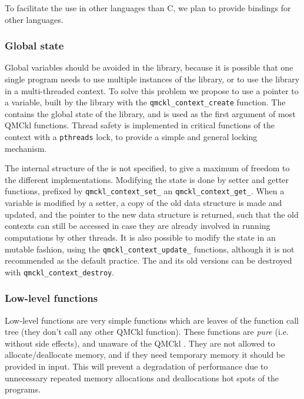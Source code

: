 To facilitate the  use in other languages than C, we plan to provide 
bindings for other languages.


\subsubsection{Global state}

Global variables should  be avoided in the library,  because it is
possible that one  single program needs to  use multiple instances
of the library, or to use the library in a multi-threaded context.
To solve this  problem we propose to use a pointer
to a {\context}  variable,  built   by  the  library   with  the
\texttt{qmckl_context_create} function. The
{\context} contains the global state of the library, and is used as
the first argument of most \ac{QMCkl} functions. Thread safety is 
implemented in critical functions of the context with a
\texttt{pthreads} lock, to provide a simple and general locking
mechanism.

The internal structure of the {\context}  is not specified, to give a
maximum of  freedom to  the different  implementations.  Modifying
the  state   is  done   by  setter   and  getter functions,   prefixed  by
\texttt{qmckl_context_set_}  an
\texttt{qmckl_context_get_}.
When a {\context} variable is modified by a setter, a copy of the old
data structure is made and updated, and the pointer to the new data
structure is returned, such that the old contexts can still be
accessed in case they are already involved in running computations by
other threads. It is also possible to modify the state in an mutable
fashion, using the \texttt{qmckl_context_update_} functions,
although it is not recommended as the default practice.
The {\context} and its old versions can be destroyed with
\texttt{qmckl_context_destroy}.


\subsubsection{Low-level functions}

Low-level functions are very simple functions which are leaves of
the function call tree (they don't call any other \ac{QMCkl} function).
These  functions   are   \emph{pure} (i.e. without side effects), and
unaware of the \ac{QMCkl} {\context}. They are not allowed to
allocate/deallocate memory, and if they need temporary memory it
should be provided in input. This will prevent a degradation of
performance due to unnecessary repeated memory allocations and
deallocations hot spots of the programs.


